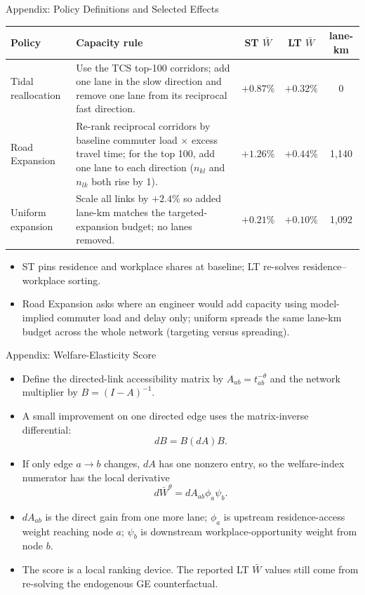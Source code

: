\documentclass[11pt,aspectratio=169]{beamer}
\newcommand{\navback}[1]{\par\vspace{0.35em}\noindent\hfill\hyperlink{#1}{\beamerreturnbutton{back}}}
\begin{document}
\begin{frame}[label=apppolicy]{Appendix: Policy Definitions and Selected Effects}
\scriptsize
\begin{center}
\begin{tabular}{p{}p{}ccc}
\toprule
Policy & Capacity rule & ST $\bar W$ & LT $\bar W$ & lane-km \\
\midrule
Tidal reallocation & Use the TCS top-100 corridors; add one lane in the slow direction and remove one lane from its reciprocal fast direction. & $+0.87\%$ & $+0.32\%$ & 0 \\
Road Expansion & Re-rank reciprocal corridors by baseline commuter load $\times$ excess travel time; for the top 100, add one lane to each direction ($n_{kl}$ and $n_{lk}$ both rise by 1). & $+1.26\%$ & $+0.44\%$ & 1{,}140 \\
Uniform expansion & Scale all links by $+2.4\%$ so added lane-km matches the targeted-expansion budget; no lanes removed. & $+0.21\%$ & $+0.10\%$ & 1{,}092 \\
\bottomrule
\end{tabular}
\end{center}
\vspace{0.2em}
\begin{itemize}\footnotesize
  \item ST pins residence and workplace shares at baseline; LT re-solves residence--workplace sorting.
  \item Road Expansion asks where an engineer would add capacity using model-implied commuter load and delay only; uniform spreads the same lane-km budget across the whole network (targeting versus spreading).
\end{itemize}
\navback{result4}
\end{frame}

\begin{frame}[label=appelast]{Appendix: Welfare-Elasticity Score}
\scriptsize
\begin{itemize}
  \item Define the directed-link accessibility matrix by $A_{ab}=t_{ab}^{-\theta}$ and the network multiplier by $B=(I-A)^{-1}$.
  \item A small improvement on one directed edge uses the matrix-inverse differential:
  \[
    dB=B(dA)B.
  \]
  \item If only edge $a\to b$ changes, $dA$ has one nonzero entry, so the welfare-index numerator has the local derivative
  \[
    d\bar W^\theta=dA_{ab}\phi_a\psi_b.
  \]
  \item $dA_{ab}$ is the direct gain from one more lane; $\phi_a$ is upstream residence-access weight reaching node $a$; $\psi_b$ is downstream workplace-opportunity weight from node $b$.
  \item The score is a local ranking device. The reported LT $\bar W$ values still come from re-solving the endogenous GE counterfactual.
\end{itemize}
\navback{resultelast}
\end{frame}
\end{document}
